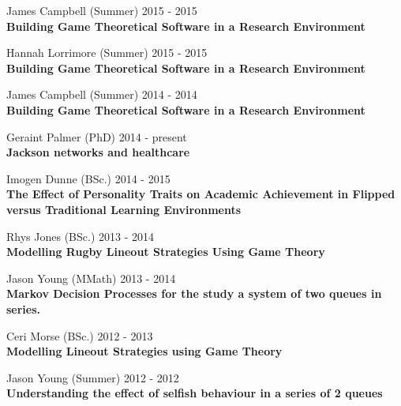 \documentclass[10pt]{res} %
\begin{document}
\begin{resume}
\begin{etaremune}
\item
    James Campbell (Summer) \hfill 2015 -
    2015\\
\textbf{Building Game Theoretical Software in a Research Environment}\\

\item
    Hannah Lorrimore (Summer) \hfill 2015 -
    2015\\
\textbf{Building Game Theoretical Software in a Research Environment}\\

\item
    James Campbell (Summer) \hfill 2014 -
    2014\\
\textbf{Building Game Theoretical Software in a Research Environment}\\

\item
    Geraint Palmer (PhD) \hfill 2014 -
    present\\
\textbf{Jackson networks and healthcare}\\

\item
    Imogen Dunne (BSc.) \hfill 2014 -
    2015\\
\textbf{The Effect of Personality Traits on Academic Achievement in Flipped versus Traditional Learning Environments}\\

\item
    Rhys Jones (BSc.) \hfill 2013 -
    2014\\
\textbf{Modelling Rugby Lineout Strategies Using Game Theory}\\

\item
    Jason Young (MMath) \hfill 2013 -
    2014\\
\textbf{Markov Decision Processes for the study a system of two queues in series.}\\

\item
    Ceri Morse (BSc.) \hfill 2012 -
    2013\\
\textbf{Modelling Lineout Strategies using Game Theory}\\

\item
    Jason Young (Summer) \hfill 2012 -
    2012\\
\textbf{Understanding the effect of selfish behaviour in a series of 2 queues}\\


\end{etaremune}
\end{resume}
\end{document}
